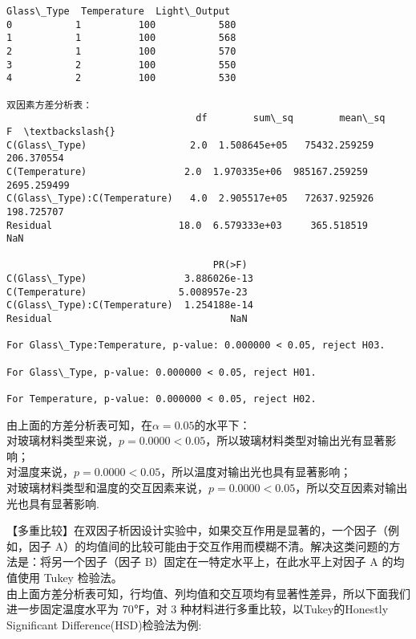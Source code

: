 \documentclass[11pt]{ctexart}
\begin{document}
    \begin{Verbatim}[commandchars=\\\{\}]
   Glass\_Type  Temperature  Light\_Output
0           1          100           580
1           1          100           568
2           1          100           570
3           2          100           550
4           2          100           530

双因素方差分析表：
                                 df        sum\_sq        mean\_sq            F  \textbackslash{}
C(Glass\_Type)                  2.0  1.508645e+05   75432.259259   206.370554
C(Temperature)                 2.0  1.970335e+06  985167.259259  2695.259499
C(Glass\_Type):C(Temperature)   4.0  2.905517e+05   72637.925926   198.725707
Residual                      18.0  6.579333e+03     365.518519          NaN

                                    PR(>F)
C(Glass\_Type)                 3.886026e-13
C(Temperature)                5.008957e-23
C(Glass\_Type):C(Temperature)  1.254188e-14
Residual                               NaN

For Glass\_Type:Temperature, p-value: 0.000000 < 0.05, reject H03.

For Glass\_Type, p-value: 0.000000 < 0.05, reject H01.

For Temperature, p-value: 0.000000 < 0.05, reject H02.
    \end{Verbatim}

    由上面的方差分析表可知，在\(\alpha=0.05\)的水平下：\\
对玻璃材料类型来说，\(p=0.0000<0.05\)，所以玻璃材料类型对输出光有显著影响；\\
对温度来说，\(p=0.0000<0.05\)，所以温度对输出光也具有显著影响；\\
对玻璃材料类型和温度的交互因素来说，\(p=0.0000<0.05\)，所以交互因素对输出光也具有显著影响.

    【多重比较】在双因子析因设计实验中，如果交互作用是显著的，一个因子（例如，因子
A）的均值间的比较可能由于交互作用而模糊不清。解决这类问题的方法是：将另一个因子（因子
B）固定在一特定水平上，在此水平上对因子 A 的均值使用 Tukey 检验法。\\
由上面方差分析表可知，行均值、列均值和交互项均有显著性差异，所以下面我们进一步固定温度水平为
70℉，对 3 种材料进行多重比较，以Tukey的Honestly Significant
Difference(HSD)检验法为例:
\end{document}
